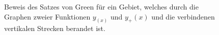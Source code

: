 %
%
%
\begin{figure}
\centering
\caption{Beweis des Satzes von Green für ein Gebiet, welches durch
die Graphen zweier Funktionen $y_(x)$ und $y_+(x)$ und die verbindenen
vertikalen Strecken berandet ist.
\label{buch:felder:fundamentallemma:fig:greenbeweis}}
\end{figure}
